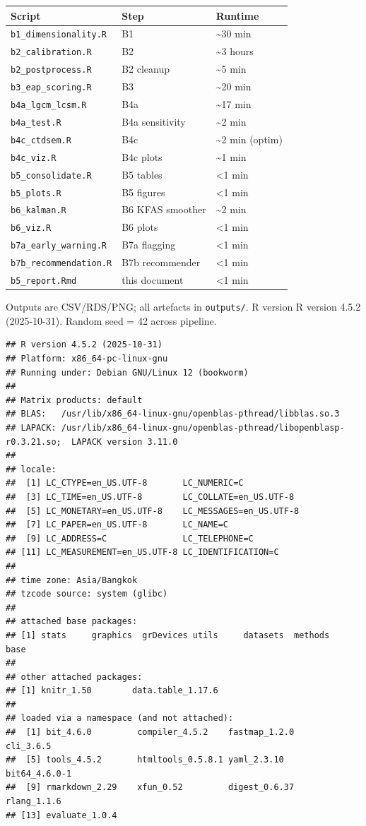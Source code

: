 \documentclass[
]{article}
\begin{document}
\begin{longtable}[]{@{}lll@{}}
\toprule
Script & Step & Runtime \\
\midrule
\endhead
\texttt{b1\_dimensionality.R} & B1 & \textasciitilde30 min \\
\texttt{b2\_calibration.R} & B2 & \textasciitilde3 hours \\
\texttt{b2\_postprocess.R} & B2 cleanup & \textasciitilde5 min \\
\texttt{b3\_eap\_scoring.R} & B3 & \textasciitilde20 min \\
\texttt{b4a\_lgcm\_lcsm.R} & B4a & \textasciitilde17 min \\
\texttt{b4a\_test.R} & B4a sensitivity & \textasciitilde2 min \\
\texttt{b4c\_ctdsem.R} & B4c & \textasciitilde2 min (optim) \\
\texttt{b4c\_viz.R} & B4c plots & \textasciitilde1 min \\
\texttt{b5\_consolidate.R} & B5 tables & \textless1 min \\
\texttt{b5\_plots.R} & B5 figures & \textless1 min \\
\texttt{b6\_kalman.R} & B6 KFAS smoother & \textasciitilde2 min \\
\texttt{b6\_viz.R} & B6 plots & \textless1 min \\
\texttt{b7a\_early\_warning.R} & B7a flagging & \textless1 min \\
\texttt{b7b\_recommendation.R} & B7b recommender & \textless1 min \\
\texttt{b5\_report.Rmd} & this document & \textless1 min \\
\bottomrule
\end{longtable}

Outputs are CSV/RDS/PNG; all artefacts in \texttt{outputs/}. R version R
version 4.5.2 (2025-10-31). Random seed = 42 across pipeline.

\begin{verbatim}
## R version 4.5.2 (2025-10-31)
## Platform: x86_64-pc-linux-gnu
## Running under: Debian GNU/Linux 12 (bookworm)
## 
## Matrix products: default
## BLAS:   /usr/lib/x86_64-linux-gnu/openblas-pthread/libblas.so.3 
## LAPACK: /usr/lib/x86_64-linux-gnu/openblas-pthread/libopenblasp-r0.3.21.so;  LAPACK version 3.11.0
## 
## locale:
##  [1] LC_CTYPE=en_US.UTF-8       LC_NUMERIC=C              
##  [3] LC_TIME=en_US.UTF-8        LC_COLLATE=en_US.UTF-8    
##  [5] LC_MONETARY=en_US.UTF-8    LC_MESSAGES=en_US.UTF-8   
##  [7] LC_PAPER=en_US.UTF-8       LC_NAME=C                 
##  [9] LC_ADDRESS=C               LC_TELEPHONE=C            
## [11] LC_MEASUREMENT=en_US.UTF-8 LC_IDENTIFICATION=C       
## 
## time zone: Asia/Bangkok
## tzcode source: system (glibc)
## 
## attached base packages:
## [1] stats     graphics  grDevices utils     datasets  methods   base     
## 
## other attached packages:
## [1] knitr_1.50        data.table_1.17.6
## 
## loaded via a namespace (and not attached):
##  [1] bit_4.6.0         compiler_4.5.2    fastmap_1.2.0     cli_3.6.5        
##  [5] tools_4.5.2       htmltools_0.5.8.1 yaml_2.3.10       bit64_4.6.0-1    
##  [9] rmarkdown_2.29    xfun_0.52         digest_0.6.37     rlang_1.1.6      
## [13] evaluate_1.0.4
\end{verbatim}
\end{document}

